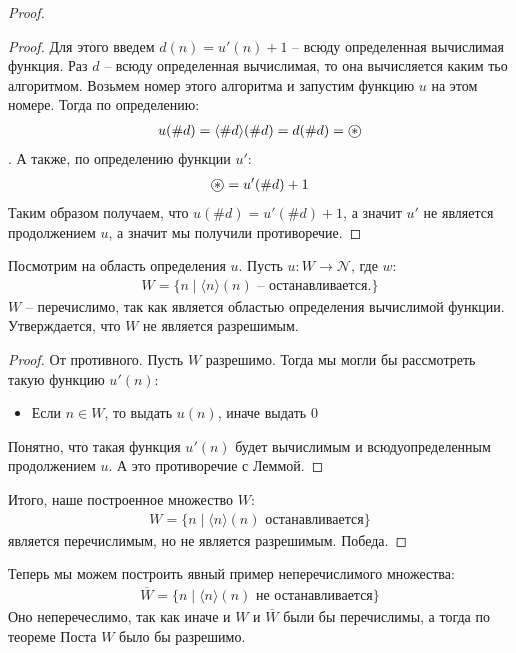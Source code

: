 \begin{itemize}
\begin{proof}
\begin{proof}
            Для этого введем $d(n) = u'(n) + 1$ -- всюду определенная вычислимая функция. Раз $d$ -- всюду определенная вычислимая, то она вычисляется каким тьо алгоритмом. Возьмем номер этого алгоритма и запустим функцию $u$ на этом номере. Тогда по определению:
            \begin{gather*}
                u(\# d) = \langle \# d \rangle (\# d)= d (\# d) = \oast
            \end{gather*}. А также, по определению функции $u'$:
            \begin{gather*}
                \oast = u'(\# d) + 1
            \end{gather*}
            Таким образом получаем, что $u(\# d) = u'(\# d) + 1$, а значит $u'$ не является продолжением $u$, а значит мы получили противоречие.
        \end{proof}
        \follow \; Посмотрим на область определения $u$. Пусть $u : W \longrightarrow \mathcal{N}$, где $w$:
        \begin{gather*}
            W = \{n \mid \langle n \rangle (n) \text{ -- останавливается.} \}
        \end{gather*} 
        $W$ -- перечислимо, так как является областью определения вычислимой функции. Утверждается, что $W$ не является разрешимым.
        \begin{proof}
            От противного. Пусть $W$ разрешимо. Тогда мы могли бы рассмотреть такую функцию $u'(n)$:
            \begin{itemize}
                \item Если $n \in W$, то выдать $u(n)$, иначе выдать 0
            \end{itemize} 
            Понятно, что такая функция $u'(n)$ будет вычислимым и всюдуопределенным продолжением $u$. А это противоречие с Леммой. 
        \end{proof}
        Итого, наше построенное множество $W$:
        \begin{gather*}
            W = \{n \mid \langle n \rangle (n) \text{ останавливается}\}
        \end{gather*} 
        является перечислимым, но не является разрешимым. Победа.
    \end{proof} 
    \notice \; Теперь мы можем построить явный пример неперечислимого множества:
    \begin{gather*}
        \overline W = \{n \mid \langle n \rangle (n) \text{ не останавливается}\}
    \end{gather*}
    Оно неперечеслимо, так как иначе и $W$ и $\overline W$ были бы перечислимы, а тогда по теореме Поста $W$ было бы разрешимо. 
\end{itemize}

